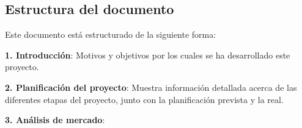 \newpage

\subsection{Estructura del documento}

Este documento está estructurado de la siguiente forma:

\textbf{1. Introducción}: Motivos y objetivos por los cuales se ha desarrollado este proyecto.

\textbf{2. Planificación del proyecto}: Muestra información detallada acerca de las diferentes etapas del proyecto, junto con la planificación prevista y la real.

\textbf{3. Análisis de mercado}: 

\newpage


